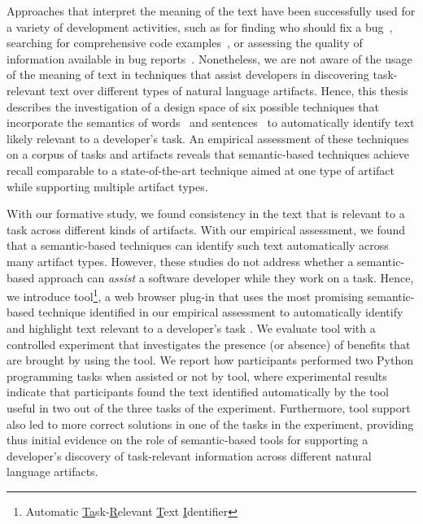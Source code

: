 Approaches that interpret the meaning of the text have been successfully used for a variety of development activities,
such as for finding who should fix a bug~\cite{yang2016}, searching for comprehensive code examples~\cite{silva2019}, or assessing the quality of information available in bug reports~\cite{chaparro2019}.
Nonetheless, we are not aware of the usage of the meaning of text in techniques 
that assist developers in discovering task-relevant text over different types of natural language artifacts.
Hence, this thesis describes the investigation of a design space
of six possible techniques that incorporate the semantics of words~\cite{Mikolov2013, Devlin2018Bert}
and sentences~\cite{fillmore1976frame, marques2021}
to automatically identify text likely relevant to a developer's task.
An empirical assessment of these techniques 
on a corpus of tasks
and artifacts reveals that semantic-based techniques
achieve recall comparable to a state-of-the-art technique aimed at one type of artifact~\cite{Xu2017}
while supporting
multiple artifact types.






With our formative study, we found consistency in the text  that is relevant to a task across different kinds of artifacts.
With our empirical assessment, we found that a semantic-based techniques can identify such text
automatically across many artifact types.
However, these studies do not address whether a semantic-based approach can \textit{assist} a software developer while they work on a task.
Hence, we introduce \acs{tool}\footnote{
    Automatic \underline{Ta}sk-\underline{R}elevant \underline{T}ext \underline{I}dentifier
}, a web browser plug-in that 
uses the most promising semantic-based technique identified in our empirical assessment
to automatically identify and highlight text relevant to a developer's task .
We evaluate \acs{tool} with a controlled experiment that investigates the presence (or absence) of benefits that are brought by using the tool.
We report how  participants 
performed two Python programming tasks when 
 assisted or not by \acs{tool},
where experimental results indicate that participants found the text identified automatically
by the tool 
useful in two out of the three tasks of the experiment.
Furthermore, tool support also led to more correct solutions 
in one of the tasks in the experiment, providing thus
initial evidence on the role of semantic-based tools 
for supporting a developer's discovery of task-relevant information
across different natural language artifacts.
